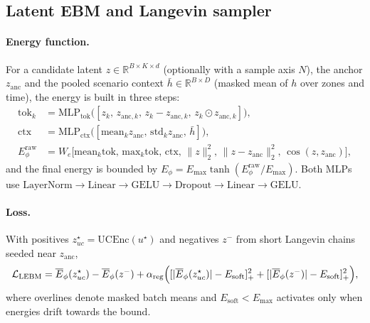 \documentclass{article}
\begin{document}
\subsection{Latent EBM and Langevin sampler}
\label{app:latent_ebm_arch}

\paragraph{Energy function.}
For a candidate latent $z \in \mathbb{R}^{B\times K\times d}$ (optionally with a sample axis $N$), the anchor $z_{\mathrm{anc}}$ and the pooled scenario context $\bar h \in \mathbb{R}^{B\times D}$ (masked mean of $h$ over zones and time), the energy is built in three steps:
\begin{align}
\mathrm{tok}_k     &= \mathrm{MLP}_{\mathrm{tok}}\bigl([z_k,\,z_{\mathrm{anc},k},\,z_k - z_{\mathrm{anc},k},\,z_k \odot z_{\mathrm{anc},k}]\bigr), \\
\mathrm{ctx}       &= \mathrm{MLP}_{\mathrm{ctx}}\bigl([\mathrm{mean}_k z_{\mathrm{anc}},\,\mathrm{std}_k z_{\mathrm{anc}},\,\bar h]\bigr), \\
E_\phi^{\mathrm{raw}} &= W_e\bigl[\mathrm{mean}_k \mathrm{tok},\,\mathrm{max}_k \mathrm{tok},\,\mathrm{ctx},\,\|z\|_2^2,\,\|z - z_{\mathrm{anc}}\|_2^2,\,\cos(z, z_{\mathrm{anc}})\bigr],
\end{align}
and the final energy is bounded by $E_\phi = E_{\max}\tanh(E_\phi^{\mathrm{raw}} / E_{\max})$. Both MLPs use $\mathrm{LayerNorm} \to \mathrm{Linear} \to \mathrm{GELU} \to \mathrm{Dropout} \to \mathrm{Linear} \to \mathrm{GELU}$.

\paragraph{Loss.}
With positives $z^\star_{uc} = \mathrm{UCEnc}(u^\star)$ and negatives $z^-$ from short Langevin chains seeded near $z_{\mathrm{anc}}$,
\begin{equation}
\mathcal{L}_{\mathrm{LEBM}} = \overline{E}_\phi(z^\star_{uc}) - \overline{E}_\phi(z^-) + \alpha_{\mathrm{reg}}\Bigl([|\overline{E}_\phi(z^\star_{uc})| - E_{\mathrm{soft}}]_+^2 + [|\overline{E}_\phi(z^-)| - E_{\mathrm{soft}}]_+^2\Bigr),
\end{equation}
where overlines denote masked batch means and $E_{\mathrm{soft}} < E_{\max}$ activates only when energies drift towards the bound.
\end{document}

